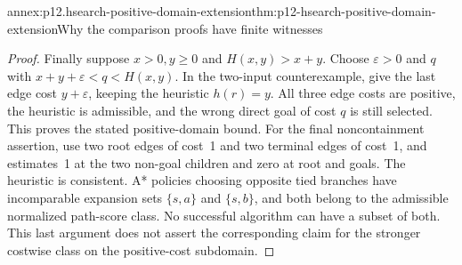 \begin{annexitem}{annex:p12.hsearch-positive-domain-extension}{thm:p12-hsearch-positive-domain-extension}{Why the comparison proofs have finite witnesses}
\begin{proof}
Finally suppose \(x>0,y\ge 0\) and \(H(x,y)>x+y\).
Choose \(\varepsilon>0\) and \(q\) with
\(x+y+\varepsilon<q<H(x,y)\). In the two-input counterexample,
give the last edge cost \(y+\varepsilon\), keeping the heuristic
\(h(r)=y\). All three edge costs are positive, the heuristic is
admissible, and the wrong direct goal of cost \(q\) is still
selected. This proves the stated positive-domain bound. For the final
noncontainment assertion, use two root edges of cost~1 and two terminal
edges of cost~1, and estimates~1 at the two non-goal children and zero at
root and goals. The heuristic is consistent. A* policies choosing
opposite tied branches have incomparable expansion sets
\(\{s,a\}\) and \(\{s,b\}\), and both belong to the admissible
normalized path-score class. No successful algorithm can have a subset
of both. This last argument does not assert the corresponding claim
for the stronger costwise class on the positive-cost subdomain.
\end{proof}
\end{annexitem}


